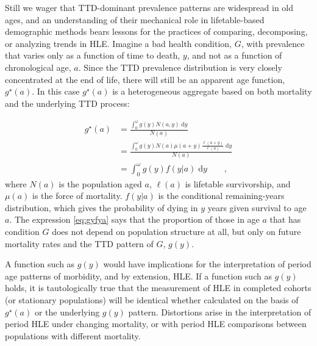 \documentclass[12pt,oneside,a4paper]{article} %
\newcommand{\dd}{\; \mathrm{d}}
\newcommand{\tc}{\quad\quad\text{,}}
\begin{document}
 \FloatBarrier

Still we wager that TTD-dominant prevalence patterns are widespread in old ages, and an understanding of their mechanical role in lifetable-based demographic methods bears lessons for the practices of comparing, decomposing, or analyzing trends in HLE. 
Imagine a bad health condition, $G$, with prevalence that varies only as a
function of time to death, $y$, and not as a function of chronological age, $a$.
Since the TTD prevalence distribution is very closely concentrated at the end of life, there will still be an apparent age function,
$g^\star(a)$.
In this case $g^\star(a)$ is a heterogeneous aggregate based on both mortality
and the underlying TTD process:
 
\begin{align}
g^\star(a) &= \frac{\int _0^\omega g(y) N(a,y) \dd y}{N(a)} \\
      &= \frac{\int _0^\omega g(y) N(a)
      \mu(a+y)\frac{\ell(a+y)}{\ell(a)}\dd y}{N(a)}\\
      &= \int _0^\omega g(y) f(y|a)\dd y \label{eq:gyfya}\tc
\end{align}
where $N(a)$ is the population aged $a$, $\ell(a)$ is lifetable survivorship, and
$\mu(a)$ is the force of mortality. $f(y|a)$ is the conditional remaining-years
distribution, which gives the probability of dying in $y$ years given survival
to age $a$. The expression \eqref{eq:gyfya} says that the proportion of those in
age $a$ that has condition $G$ does not depend on population structure at all, but only on future mortality rates and the TTD pattern of $G$, $g(y)$. 

A function such as $g(y)$ would have implications for the interpretation of
period age patterns of morbidity, and by extension, HLE. If a function such as $g(y)$ holds, it is tautologically true that the
measurement of HLE in completed cohorts (or stationary populations)
will be identical whether calculated on the basis of $g^\star(a)$ or the
underlying $g(y)$ pattern. Distortions arise in the interpretation of
period HLE under changing mortality, or with period HLE comparisons between
populations with different mortality. 

\end{document}
